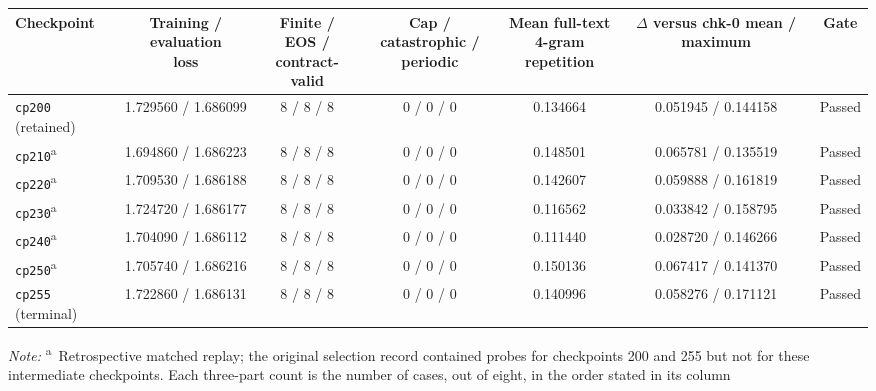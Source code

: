 \begin{table}[htbp]
    \centering
    \scriptsize
    \setlength{\tabcolsep}{3.25pt}
    \renewcommand{\arraystretch}{1.15}
    \begin{tabular}{@{}lcccccc@{}}
        \toprule
        \textbf{Checkpoint} &
        \makecell{\textbf{Training / evaluation}\\\textbf{loss}} &
        \makecell{\textbf{Finite / EOS /}\\\textbf{contract-valid}} &
        \makecell{\textbf{Cap / catastrophic /}\\\textbf{periodic}} &
        \makecell{\textbf{Mean full-text}\\\textbf{4-gram repetition}} &
        \makecell{\textbf{$\Delta$ versus chk-0}\\\textbf{mean / maximum}} &
        \textbf{Gate} \\
        \midrule
        \texttt{cp200} (retained) & 1.729560 / 1.686099 & 8 / 8 / 8 & 0 / 0 / 0 & 0.134664 & 0.051945 / 0.144158 & Passed \\
        \texttt{cp210}\textsuperscript{a} & 1.694860 / 1.686223 & 8 / 8 / 8 & 0 / 0 / 0 & 0.148501 & 0.065781 / 0.135519 & Passed \\
        \texttt{cp220}\textsuperscript{a} & 1.709530 / 1.686188 & 8 / 8 / 8 & 0 / 0 / 0 & 0.142607 & 0.059888 / 0.161819 & Passed \\
        \texttt{cp230}\textsuperscript{a} & 1.724720 / 1.686177 & 8 / 8 / 8 & 0 / 0 / 0 & 0.116562 & 0.033842 / 0.158795 & Passed \\
        \texttt{cp240}\textsuperscript{a} & 1.704090 / 1.686112 & 8 / 8 / 8 & 0 / 0 / 0 & 0.111440 & 0.028720 / 0.146266 & Passed \\
        \texttt{cp250}\textsuperscript{a} & 1.705740 / 1.686216 & 8 / 8 / 8 & 0 / 0 / 0 & 0.150136 & 0.067417 / 0.141370 & Passed \\
        \texttt{cp255} (terminal) & 1.722860 / 1.686131 & 8 / 8 / 8 & 0 / 0 / 0 & 0.140996 & 0.058276 / 0.171121 & Passed \\
        \bottomrule
    \end{tabular}
    \begin{minipage}{0.97\textwidth}
        \vspace{2pt}
        \footnotesize
        \textit{Note:} \textsuperscript{a}\ Retrospective matched replay; the
        original selection record contained probes for checkpoints 200 and 255
        but not for these intermediate checkpoints. Each three-part count is
        the number of cases, out of eight, in the order stated in its column

\end{minipage}
\end{table}
